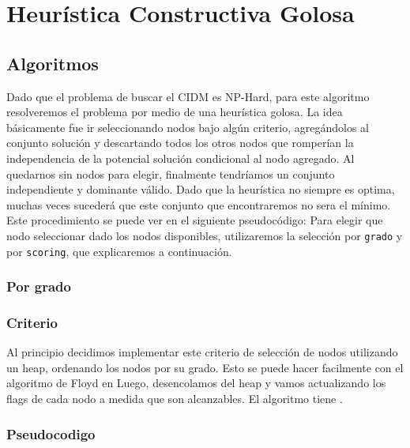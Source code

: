 \section{Heurística Constructiva Golosa}

\subsection{Algoritmos}

Dado que el problema de buscar el CIDM es NP-Hard, para este algoritmo resolveremos el problema por medio de una heurística golosa. La idea básicamente fue ir seleccionando nodos bajo algún criterio, agregándolos al conjunto solución y descartando todos los otros nodos que romperían la independencia de la potencial solución condicional al nodo agregado. Al quedarnos sin nodos para elegir, finalmente tendríamos un conjunto independiente y dominante válido. Dado que la heurística no siempre es optima, muchas veces sucederá que este conjunto que encontraremos no sera el mínimo. Este procedimiento se puede ver en el siguiente pseudocódigo: Para elegir que nodo seleccionar dado los nodos disponibles, utilizaremos la selección por \texttt{grado} y por \texttt{scoring}, que explicaremos a continuación.


\subsubsection{Por grado}

\subsubsection*{Criterio}

Al principio decidimos implementar este criterio de selección de nodos utilizando un heap, ordenando los nodos por su grado. Esto se puede hacer facilmente con el algoritmo de Floyd en Luego, desencolamos del heap y vamos actualizando los flags de cada nodo a medida que son alcanzables. El algoritmo tiene .

\subsubsection*{Pseudocodigo}

\begin{algorithmic}


	\EndIf
	
	\EndFor
\EndWhile
\EndProcedure
\end{algorithmic}

